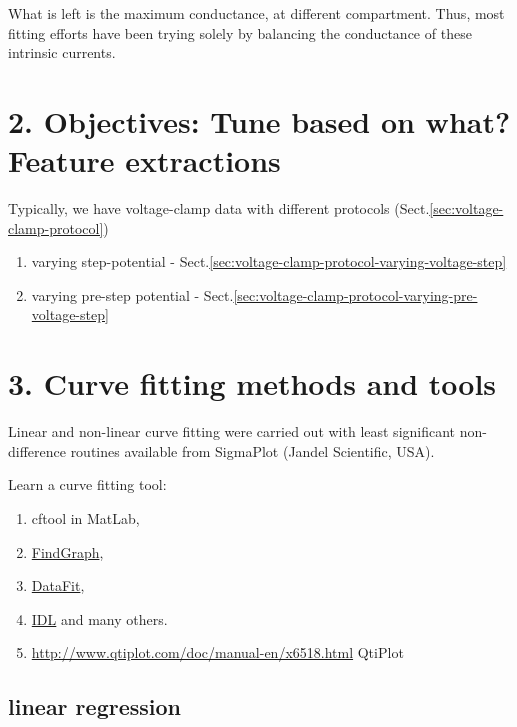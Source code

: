 What is left is the maximum conductance, at different compartment. Thus, most
fitting efforts have been trying solely by balancing the conductance of these
intrinsic currents.

\section{2. Objectives: Tune based on what? Feature extractions}

Typically, we have voltage-clamp data with different protocols
(Sect.\ref{sec:voltage-clamp-protocol})
\begin{enumerate}
  \item varying step-potential - Sect.\ref{sec:voltage-clamp-protocol-varying-voltage-step}

  \item varying pre-step potential - Sect.\ref{sec:voltage-clamp-protocol-varying-pre-voltage-step}
\end{enumerate}

\section{3. Curve fitting methods and tools}
\label{sec:fit-methods-curve-fitting}
\label{sec:curve-fitting}
\label{sec:curve-fitting-tools}


Linear and non-linear curve fitting were carried out with least
significant non-difference routines available from SigmaPlot (Jandel
Scientific, USA).

Learn a curve fitting tool:
\begin{enumerate}
  \item cftool in MatLab,
  \item \href{http://www.uniphiz.com/fitting.htm}{FindGraph},
  \item \href{http://curve-fitting.qarchive.org/}{DataFit},
  \item \href{http://www.physics.wisc.edu/~craigm/idl/idl.html}{IDL} and many
others.

  \item \url{http://www.qtiplot.com/doc/manual-en/x6518.html} QtiPlot
\end{enumerate}


\subsection{linear regression}
\label{sec:fit-using-linear-regression}

